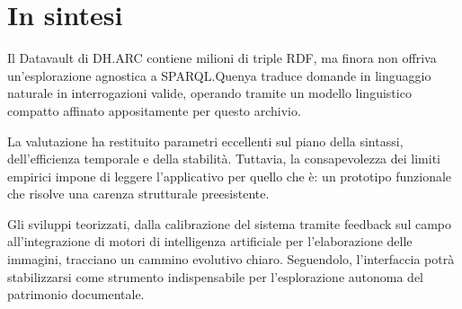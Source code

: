 \section{In sintesi}\label{sec:conclusioni_finali}

Il Datavault di DH.ARC contiene milioni di triple RDF, ma finora non offriva un'esplorazione agnostica a SPARQL.\@ Quenya traduce domande in linguaggio naturale in interrogazioni valide, operando tramite un modello linguistico compatto affinato appositamente per questo archivio.

La valutazione ha restituito parametri eccellenti sul piano della sintassi, dell'efficienza temporale e della stabilità. Tuttavia, la consapevolezza dei limiti empirici impone di leggere l'applicativo per quello che è: un prototipo funzionale che risolve una carenza strutturale preesistente. 

Gli sviluppi teorizzati, dalla calibrazione del sistema tramite feedback sul campo all'integrazione di motori di intelligenza artificiale per l'elaborazione delle immagini, tracciano un cammino evolutivo chiaro. Seguendolo, l'interfaccia potrà stabilizzarsi come strumento indispensabile per l'esplorazione autonoma del patrimonio documentale.
